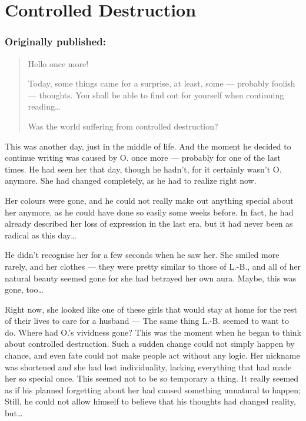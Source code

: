 \chapter{Controlled Destruction}
\label{cha:contr-destr}
\subsection*{Originally published: }
\begin{quote}
Hello once more! 

Today, some things came for a surprise, at least, some --- probably foolish --- thoughts. You shall be able to find out for yourself when continuing reading\ldots

Was the world suffering from controlled destruction?
\end{quote}

This was another day, just in the middle of life. And the moment he decided to continue writing was caused by O. once more --- probably for one of the last times. 
He had seen her that day, though he hadn't, for it certainly wasn't O. anymore. She had changed completely, as he had to realize right now.

Her colours were gone, and he could not really make out anything special about her anymore, as he could have done so easily some weeks before. In fact, he had already described her loss of expression in the last era, but it had never been as radical as this day\ldots

He didn't recognise her for a few seconds when he saw her. She smiled more rarely, and her clothes --- they were pretty similar to those of L.-B., and all of her natural beauty seemed gone for she had betrayed her own aura. Maybe, this was gone, too\ldots

Right now, she looked like one of these girls that would stay at home for the rest of their lives to care for a husband --- The same thing L.-B. seemed to want to do. Where had O.'s vividness gone? 
This was the moment when he began to think about controlled destruction. Such a sudden change could not simply happen by chance, and even fate could not make people act without any logic. Her nickname was shortened and she had lost individuality, lacking everything that had made her so special once. This seemed not to be so temporary a thing. It really seemed as if his planned forgetting about her had caused something unnatural to happen; Still, he could not allow himself to believe that his thoughts had changed reality, but\ldots

